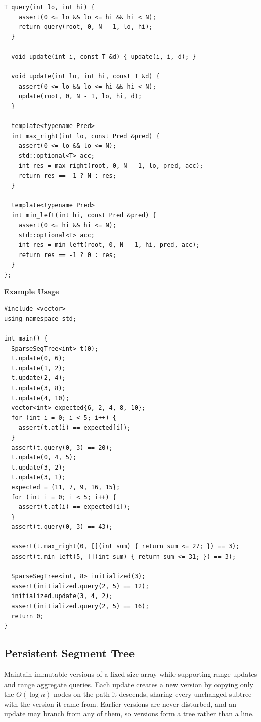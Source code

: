 \begin{lstlisting}[style=cpp]
  T query(int lo, int hi) {
    assert(0 <= lo && lo <= hi && hi < N);
    return query(root, 0, N - 1, lo, hi);
  }

  void update(int i, const T &d) { update(i, i, d); }

  void update(int lo, int hi, const T &d) {
    assert(0 <= lo && lo <= hi && hi < N);
    update(root, 0, N - 1, lo, hi, d);
  }

  template<typename Pred>
  int max_right(int lo, const Pred &pred) {
    assert(0 <= lo && lo <= N);
    std::optional<T> acc;
    int res = max_right(root, 0, N - 1, lo, pred, acc);
    return res == -1 ? N : res;
  }

  template<typename Pred>
  int min_left(int hi, const Pred &pred) {
    assert(0 <= hi && hi <= N);
    std::optional<T> acc;
    int res = min_left(root, 0, N - 1, hi, pred, acc);
    return res == -1 ? 0 : res;
  }
};
\end{lstlisting}
\textbf{Example Usage}\par
\begin{lstlisting}[style=cpp]
#include <vector>
using namespace std;

int main() {
  SparseSegTree<int> t(0);
  t.update(0, 6);
  t.update(1, 2);
  t.update(2, 4);
  t.update(3, 8);
  t.update(4, 10);
  vector<int> expected{6, 2, 4, 8, 10};
  for (int i = 0; i < 5; i++) {
    assert(t.at(i) == expected[i]);
  }
  assert(t.query(0, 3) == 20);
  t.update(0, 4, 5);
  t.update(3, 2);
  t.update(3, 1);
  expected = {11, 7, 9, 16, 15};
  for (int i = 0; i < 5; i++) {
    assert(t.at(i) == expected[i]);
  }
  assert(t.query(0, 3) == 43);

  assert(t.max_right(0, [](int sum) { return sum <= 27; }) == 3);
  assert(t.min_left(5, [](int sum) { return sum <= 31; }) == 3);

  SparseSegTree<int, 8> initialized(3);
  assert(initialized.query(2, 5) == 12);
  initialized.update(3, 4, 2);
  assert(initialized.query(2, 5) == 16);
  return 0;
}
\end{lstlisting}
\subsection{Persistent Segment Tree}
\label{sec:2.5.11}
Maintain immutable versions of a fixed-size array while supporting range updates and range aggregate queries. Each update creates a new version by copying only the $O(\log n)$ nodes on the path it descends, sharing every unchanged subtree with the version it came from. Earlier versions are never disturbed, and an update may branch from any of them, so versions form a tree rather than a line.

